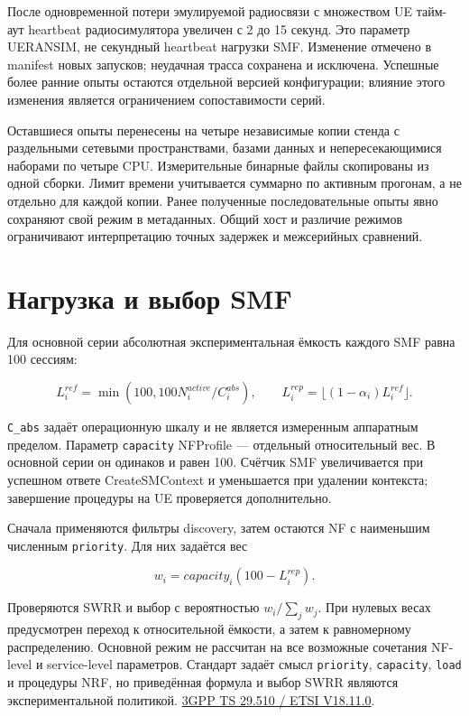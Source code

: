 \documentclass[11pt,a4paper]{article}
\begin{document}
После одновременной потери эмулируемой радиосвязи с множеством UE тайм-аут heartbeat радиосимулятора увеличен с 2 до 15 секунд. Это параметр UERANSIM, не секундный heartbeat нагрузки SMF. Изменение отмечено в manifest новых запусков; неудачная трасса сохранена и исключена. Успешные более ранние опыты остаются отдельной версией конфигурации; влияние этого изменения является ограничением сопоставимости серий.

Оставшиеся опыты перенесены на четыре независимые копии стенда с раздельными сетевыми пространствами, базами данных и непересекающимися наборами по четыре CPU. Измерительные бинарные файлы скопированы из одной сборки. Лимит времени учитывается суммарно по активным прогонам, а не отдельно для каждой копии. Ранее полученные последовательные опыты явно сохраняют свой режим в метаданных. Общий хост и различие режимов ограничивают интерпретацию точных задержек и межсерийных сравнений.

\section*{Нагрузка и выбор SMF}

Для основной серии абсолютная экспериментальная ёмкость каждого SMF равна 100 сессиям:

\[
L_i^{ref}=\min(100,100N_i^{active}/C_i^{abs}),\qquad
L_i^{rep}=\lfloor(1-\alpha_i)L_i^{ref}\rfloor.
\]

\texttt{C\_abs} задаёт операционную шкалу и не является измеренным аппаратным пределом. Параметр \texttt{capacity} NFProfile — отдельный относительный вес. В основной серии он одинаков и равен 100. Счётчик SMF увеличивается при успешном ответе CreateSMContext и уменьшается при удалении контекста; завершение процедуры на UE проверяется дополнительно.

Сначала применяются фильтры discovery, затем остаются NF с наименьшим численным \texttt{priority}. Для них задаётся вес

\[
w_i=capacity_i(100-L_i^{rep}).
\]

Проверяются SWRR и выбор с вероятностью \(w_i/\sum_jw_j\). При нулевых весах предусмотрен переход к относительной ёмкости, а затем к равномерному распределению. Основной режим не рассчитан на все возможные сочетания NF-level и service-level параметров. Стандарт задаёт смысл \texttt{priority}, \texttt{capacity}, \texttt{load} и процедуры NRF, но приведённая формула и выбор SWRR являются экспериментальной политикой. \href{https://www.etsi.org/deliver/etsi_ts/129500_129599/129510/18.11.00_60/ts_129510v181100p.pdf}{3GPP TS 29.510 / ETSI V18.11.0}.
\end{document}
